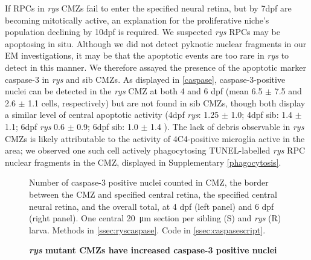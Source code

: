 \documentclass{ut-thesis}
\begin{document}
\begin{NoHyper}
If RPCs in \textit{rys} CMZs fail to enter the specified neural retina, but by 7dpf are becoming mitotically active, an explanation for the proliferative niche's population declining by 10dpf is required. We suspected \textit{rys} RPCs may be apoptosing in situ. Although we did not detect pyknotic nuclear fragments in our EM investigations, it may be that the apoptotic events are too rare in \textit{rys} to detect in this manner. We therefore assayed the presence of the apoptotic marker caspase-3 in \textit{rys} and sib CMZs. As displayed in \autoref{caspase}, caspase-3-positive nuclei can be detected in the \textit{rys} CMZ at both 4 and 6 dpf (mean 6.5 $\pm$ 7.5 and 2.6 $\pm$ 1.1 cells, respectively) but are not found in sib CMZs, though both display a similar level of central apoptotic activity (4dpf \textit{rys}: 1.25 $\pm$ 1.0; 4dpf sib: 1.4 $\pm$ 1.1; 6dpf \textit{rys} 0.6 $\pm$ 0.9; 6dpf sib: 1.0 $\pm$ 1.4 ). The lack of debris observable in \textit{rys} CMZs is likely attributable to the activity of 4C4-positive microglia active in the area; we observed one such cell actively phagocytosing TUNEL-labelled \textit{rys} RPC nuclear fragments in the CMZ, displayed in Supplementary \autoref{phagocytosis}.

\begin{figure}[!h]
    \caption{{\bf \textit{rys} mutant CMZs have increased caspase-3 positive nuclei}}
    Number of caspase-3 positive nuclei counted in CMZ, the border between the CMZ and specified central retina, the specified central neural retina, and the overall total, at 4 dpf (left panel) and 6 dpf (right panel). One central \SI{20}{\micro\metre} section per sibling (S) and \textit{rys} (R) larva.
    \label{caspase}
    Methods in \autoref{ssec:ryscaspase}.
    Code in \autoref{ssec:caspasescript}.
\end{figure}


\end{NoHyper}
\end{document}

